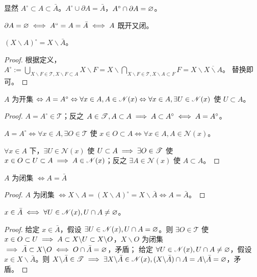 \begin{remark}
    显然 $A^\circ\subset A\subset \bar A$。$A^\circ\cup\partial A=\bar A$，$A^\circ\cap\partial A=\varnothing$。
    
    $\partial A=\varnothing\iff A^\circ=A=\bar A\iff A$ 既开又闭。
\end{remark}

\begin{theorem}
    $(X\backslash A)^\circ=X\backslash \bar A$。
\end{theorem}
\begin{proof}
    根据定义，$A^\circ:=\bigcup_{X\backslash F\in\mathscr T,X\backslash F\subset A} X\backslash F=X\backslash\bigcap_{X\backslash F\in\mathscr T,X\backslash A\subset F} F=X\backslash\overline{X\backslash A}$。
    替换即可。
\end{proof}

\begin{theorem}
    $A$ 为开集 $\Leftrightarrow A=A^\circ\Leftrightarrow\forall x\in A,A\in\mathscr N(x)\Leftrightarrow\forall x\in A,\exists U\in\mathscr N(x)$ 使 $U\subset A$。
\end{theorem}

\begin{proof}
    $A=A^\circ\in\mathscr T$；反之 $A\in\mathscr T,A\subset A\implies A\subset A^\circ\iff A=A^\circ$。

    $A=A^\circ\iff\forall x\in A,\exists O\in\mathscr T$ 使 $x\in O\subset A\iff\forall x\in A, A\in\mathscr N(x)$。
    
    $\forall x\in A$ 下，$\exists U\in\mathscr N(x)$ 使 $U\subset A\implies \exists O\in\mathscr T$ 使 $ x\in O\subset U\subset A \implies A\in\mathscr N(x)$；反之 $\exists A\in\mathscr N(x)$ 使 $A\subset A$。
\end{proof}

\begin{theorem}
    $A$ 为闭集 $\iff A=\bar A$
\end{theorem}
\begin{proof}
    $A$ 为闭集 $\iff X\backslash A=(X\backslash A)^\circ=X\backslash\bar A\iff A=\bar A$。
\end{proof}

\begin{theorem}
    $x\in\bar A\iff\forall U\in\mathscr N(x),U\cap A\ne\varnothing$。
\end{theorem}
\begin{proof}
    给定 $x\in\bar A$，假设 $\exists U \in\mathscr N(x),U \cap A=\varnothing$。则 $\exists O\in\mathscr T$ 使 $x\in O\subset U\implies A\subset X \backslash U\subset X \backslash O$，$X \backslash O$ 为闭集 $\implies \bar{A} \subset X \backslash O\iff O \cap \bar{A}=\varnothing$，矛盾；
    给定 $\forall U\in\mathscr N(x),U\cap A\ne\varnothing$，假设 $x\in X \backslash \bar{A}$。则 $X \backslash \bar{A}\in\mathscr T\implies \exists X \backslash \bar{A}\in\mathscr N(x),(X \backslash \bar{A}) \cap A=A \backslash \bar{A}=\varnothing$，矛盾。
\end{proof}

